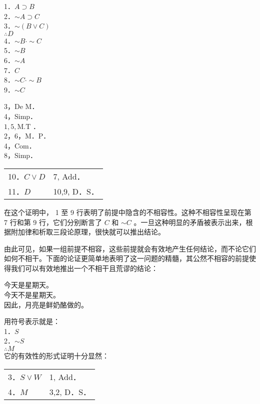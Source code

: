 1．$A \supset B$\\
2．$\sim A \supset C$\\
3．$\sim(B \vee C)$\\
$\therefore D$\\
4．$\sim B \cdot \sim C$\\
5．$\sim B$\\
6．$\sim A$\\
7．$C$\\
8．$\sim C \cdot \sim B$\\
9．$\sim C$

3，De M．\\
4，Simp．\\
$1,5, \mathrm{M} . \mathrm{T}$ ．\\
2，6，M．P．\\
4，Com．\\
8，Simp．

\begin{center}
\begin{tabular}{ll}
10．$C \vee D$ & 7, Add． \\
11．$D$ & 10,9, D．S． \\
\end{tabular}
\end{center}

在这个证明中， 1 至 9 行表明了前提中隐含的不相容性。这种不相容性呈现在第 7 行和第 9 行，它们分别断言了 $C$ 和 $\sim C$ 。一旦这种明显的矛盾被表示出来，根据附加律和析取三段论原理，很快就可以推出结论。

由此可见，如果一组前提不相容，这些前提就会有效地产生任何结论，而不论它们如何不相干。下面的论证更简单地表明了这一问题的精髓，其公然不相容的前提使得我们可以有效地推出一个不相干且荒谬的结论：

今天是星期天。\\
今天不是星期天。\\
因此，月亮是鲜奶酪做的。

用符号表示就是：\\
1．$S$\\
2．$\sim S$\\
$\therefore M$\\
它的有效性的形式证明十分显然：

\begin{center}
\begin{tabular}{ll}
3．$S \vee W$ & 1, Add． \\
4．$M$ & 3,2, D．S． \\
\end{tabular}
\end{center}

